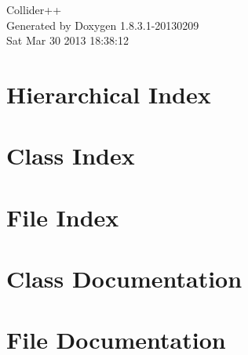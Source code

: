 \documentclass{book}
\begin{document}
\hypersetup{pageanchor=false,citecolor=blue}
\begin{titlepage}
\vspace*{7cm}
\begin{center}
{\Large Collider++ }\\
\vspace*{1cm}
{\large Generated by Doxygen 1.8.3.1-20130209}\\
\vspace*{0.5cm}
{\small Sat Mar 30 2013 18:38:12}\\
\end{center}
\end{titlepage}
\clearemptydoublepage
{}
\tableofcontents
\clearemptydoublepage
{}
\hypersetup{pageanchor=true,citecolor=blue}
\chapter{Hierarchical Index}

\chapter{Class Index}

\chapter{File Index}

\chapter{Class Documentation}








\chapter{File Documentation}






\printindex
\end{document}
